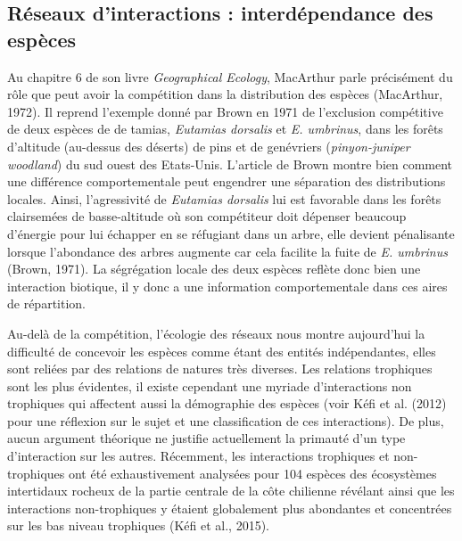 \subsection*{Réseaux d'interactions : interdépendance des
espèces}\label{ruxe9seaux-dinteractions-interduxe9pendance-des-espuxe8ces}

Au chapitre 6 de son livre \emph{Geographical Ecology}, MacArthur parle
précisément du rôle que peut avoir la compétition dans la distribution
des espèces (MacArthur, 1972). Il reprend l'exemple donné par Brown en
1971 de l'exclusion compétitive de deux espèces de de tamias,
\emph{Eutamias dorsalis} et \emph{E. umbrinus}, dans les forêts
d'altitude (au-dessus des déserts) de pins et de genévriers
(\emph{pinyon-juniper woodland}) du sud ouest des Etats-Unis. L'article
de Brown montre bien comment une différence comportementale peut
engendrer une séparation des distributions locales. Ainsi, l'agressivité
de \emph{Eutamias dorsalis} lui est favorable dans les forêts
clairsemées de basse-altitude où son compétiteur doit dépenser beaucoup
d'énergie pour lui échapper en se réfugiant dans un arbre, elle devient
pénalisante lorsque l'abondance des arbres augmente car cela facilite la
fuite de \emph{E. umbrinus} (Brown, 1971). La ségrégation locale des
deux espèces reflète donc bien une interaction biotique, il y donc a une
information comportementale dans ces aires de répartition.

Au-delà de la compétition, l'écologie des réseaux nous montre
aujourd'hui la difficulté de concevoir les espèces comme étant des
entités indépendantes, elles sont reliées par des relations de natures
très diverses. Les relations trophiques sont les plus évidentes, il
existe cependant une myriade d'interactions non trophiques qui affectent
aussi la démographie des espèces (voir Kéfi et al. (2012) pour une
réflexion sur le sujet et une classification de ces interactions). De
plus, aucun argument théorique ne justifie actuellement la primauté d'un
type d'interaction sur les autres. Récemment, les interactions
trophiques et non-trophiques ont été exhaustivement analysées pour 104
espèces des écosystèmes intertidaux rocheux de la partie centrale de la
côte chilienne révélant ainsi que les interactions non-trophiques y
étaient globalement plus abondantes et concentrées sur les bas niveau
trophiques (Kéfi et al., 2015).

